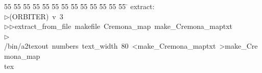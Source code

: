 %
%
\begin{tabbing}
55 \= 55 \= 55 \= 55 \= 55 \= 55 \= 55 \= 55 \= 55 \= 55 \= 55 \= 55 \= 55 \= \kill
extract:\\[0pt]
$\triangleright$\>(ORBITER)\ v\ 3\ \\[0pt]
$\triangleright$\>$\triangleright$\>extract\_from\_file\ makefile\ Cremona\_map\ make\_Cremona\_maptxt\\[0pt]
$\triangleright$\>/bin/a2texout\ numbers\ text\_width\ 80\ {\textless}make\_Cremona\_maptxt\ {\textgreater}make\_Cremona\_map\\[0pt]
tex\\[0pt]
\end{tabbing}
